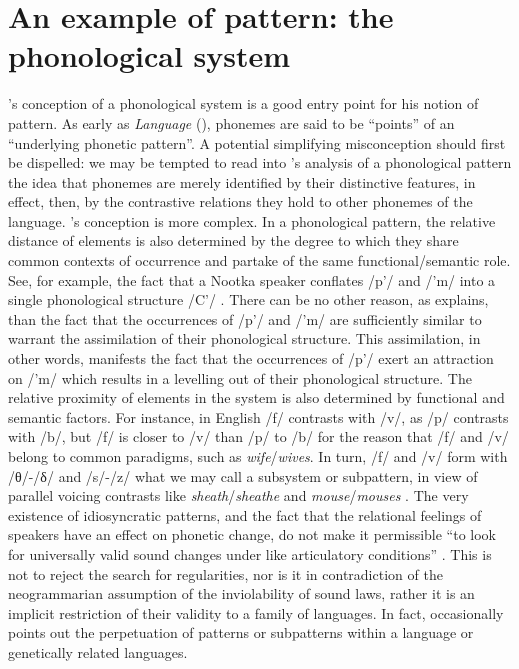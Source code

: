 \documentclass[output=paper]{langscibook}
\begin{document}
\section{An example of pattern: the phonological system}
\label{sec:fortis:egpattern}

{\Sapir}'s conception of a phonological system is a good entry point for his notion of pattern. As early as \emph{Language} (\citeyear{Sapir1921}), phonemes are said to be ``points'' of an ``underlying phonetic pattern''. A potential simplifying misconception should first be dispelled: we may be tempted to read into {\Sapir}'s analysis of a phonological pattern the idea that phonemes are merely identified by their distinctive features, in effect, then, by the contrastive relations they hold to other phonemes of the language. {\Sapir}'s conception is more complex. In a phonological pattern, the relative distance of elements is also determined by the degree to which they share common contexts of occurrence and partake of the same functional/semantic role. See, for example, the fact that a Nootka speaker conflates /p'/ and /'m/ into a single phonological structure /C'/ \citep[55--57]{Sapir1933}. There can be no other reason, as {\Sapir} explains, than the fact that the occurrences of /p'/ and /'m/ are sufficiently similar to warrant the assimilation of their phonological structure. This assimilation, in other words, manifests the fact that the occurrences of /p'/ exert an attraction on /'m/ which results in a levelling out of their phonological structure. The relative proximity of elements in the system is also determined by functional and semantic factors. For instance, in English /f/ contrasts with /v/, as /p/ contrasts with /b/, but /f/ is closer to /v/ than /p/ to /b/ for the reason that /f/ and /v/ belong to common paradigms, such as \emph{wife}/\emph{wives}. In turn, /f/ and /v/ form with /θ/-/δ/ and /s/-/z/ what we may call a subsystem or subpattern, in view of parallel voicing contrasts like \emph{sheath}/\emph{sheathe} and \emph{mouse}/\emph{mouses} \citep[48]{Sapir1933}. The very existence of idiosyncratic patterns, and the fact that the relational feelings of speakers have an effect on phonetic change, do not make it permissible ``to look for universally valid sound changes under like articulatory conditions'' \citep[48]{Sapir1933}. This is not to reject the search for regularities, nor is it in contradiction of the neogrammarian assumption of the inviolability of sound laws, rather it is an implicit restriction of their validity to a family of languages. In fact, {\Sapir} occasionally points out the perpetuation of patterns or subpatterns within a language or genetically related languages.
\end{document}
